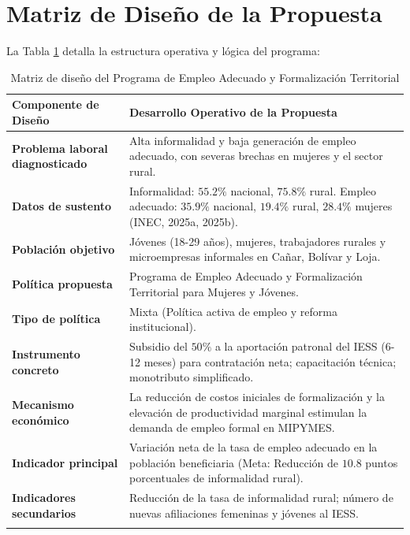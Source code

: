 \documentclass[10pt,]{article}
\begin{document}
\section{Matriz de Diseño de la
Propuesta}\label{matriz-de-diseuxf1o-de-la-propuesta}

La Tabla \ref{tbl:matriz} detalla la estructura operativa y lógica del
programa:

\begin{singlespace}
\begin{small}
\begin{longtable}{p{4.5cm} p{10.5cm}}
\caption{Matriz de diseño del Programa de Empleo Adecuado y Formalización Territorial} \label{tbl:matriz} \\
\toprule
\textbf{Componente de Diseño} & \textbf{Desarrollo Operativo de la Propuesta} \\ \midrule
\textbf{Problema laboral diagnosticado} & Alta informalidad y baja generación de empleo adecuado, con severas brechas en mujeres y el sector rural. \\ \addlinespace
\textbf{Datos de sustento} & Informalidad: $55.2\%$ nacional, $75.8\%$ rural. Empleo adecuado: $35.9\%$ nacional, $19.4\%$ rural, $28.4\%$ mujeres (INEC, 2025a, 2025b). \\ \addlinespace
\textbf{Población objetivo} & Jóvenes (18-29 años), mujeres, trabajadores rurales y microempresas informales en Cañar, Bolívar y Loja. \\ \addlinespace
\textbf{Política propuesta} & Programa de Empleo Adecuado y Formalización Territorial para Mujeres y Jóvenes. \\ \addlinespace
\textbf{Tipo de política} & Mixta (Política activa de empleo y reforma institucional). \\ \addlinespace
\textbf{Instrumento concreto} & Subsidio del $50\%$ a la aportación patronal del IESS (6-12 meses) para contratación neta; capacitación técnica; monotributo simplificado. \\ \addlinespace
\textbf{Mecanismo económico} & La reducción de costos iniciales de formalización y la elevación de productividad marginal estimulan la demanda de empleo formal en MIPYMES. \\ \addlinespace
\textbf{Indicador principal} & Variación neta de la tasa de empleo adecuado en la población beneficiaria (Meta: Reducción de $10.8$ puntos porcentuales de informalidad rural). \\ \addlinespace
\textbf{Indicadores secundarios} & Reducción de la tasa de informalidad rural; número de nuevas afiliaciones femeninas y jóvenes al IESS. \\ \addlinespace

\end{longtable}
\end{small}
\end{singlespace}
\end{document}
